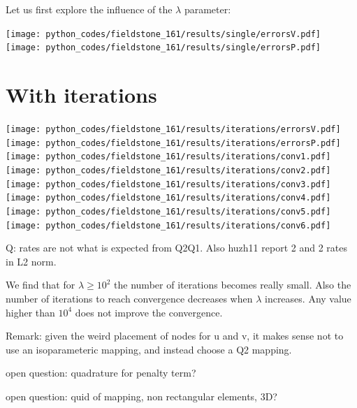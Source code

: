 Let us first explore the influence of the $\lambda$ parameter:

\begin{center}
\texttt{[image: python\_codes/fieldstone\_161/results/single/errorsV.pdf]}
\texttt{[image: python\_codes/fieldstone\_161/results/single/errorsP.pdf]}\\
\end{center}

\section*{With iterations}

\begin{center}
\texttt{[image: python\_codes/fieldstone\_161/results/iterations/errorsV.pdf]}
\texttt{[image: python\_codes/fieldstone\_161/results/iterations/errorsP.pdf]}\\
\texttt{[image: python\_codes/fieldstone\_161/results/iterations/conv1.pdf]}
\texttt{[image: python\_codes/fieldstone\_161/results/iterations/conv2.pdf]}
\texttt{[image: python\_codes/fieldstone\_161/results/iterations/conv3.pdf]}\\
\texttt{[image: python\_codes/fieldstone\_161/results/iterations/conv4.pdf]}
\texttt{[image: python\_codes/fieldstone\_161/results/iterations/conv5.pdf]}
\texttt{[image: python\_codes/fieldstone\_161/results/iterations/conv6.pdf]}
\end{center}

Q: rates are not what is expected from Q2Q1. 
Also huzh11 report 2 and 2 rates in L2 norm.

We find that for $\lambda \ge 10^2$ the number of iterations becomes really small.
Also the number of iterations to reach convergence decreases when $\lambda$ increases. 
Any value higher than $10^4$ does not improve the convergence.

 



\newpage

Remark: given the weird placement of nodes for u and v, it makes sense not to 
use an isoparameteric mapping, and instead choose a Q2 mapping.

open question: quadrature for penalty term?

open question: quid of mapping, non rectangular elements, 3D?
